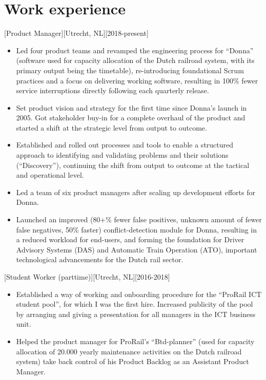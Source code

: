 \documentclass[10pt]{article}
\begin{document}
\makecvtitle

\section{Work experience}
\label{sec:work}

[Product Manager][Utrecht, NL][2018-present]
\begin{itemize}
      \item Led four product teams and revamped the engineering process for
            \enquote{Donna} (software used for capacity allocation of the Dutch railroad
            system, with its primary output being the timetable), re-introducing
            foundational Scrum practices and a focus on delivering working software,
            resulting in 100\% fewer service interruptions directly following each
            quarterly release.
      \item Set product vision and strategy for the first time since Donna's launch
            in 2005. Got stakeholder buy-in for a complete overhaul of the product and
            started a shift at the strategic level from output to outcome.
      \item Established and rolled out processes and tools to enable a structured
            approach to identifying and validating problems and their solutions
            (\enquote{Discovery}), continuing the shift from output to outcome at the
            tactical and operational level.
      \item Led a team of six product managers after scaling up development efforts
            for Donna.
      \item Launched an improved (80+\% fewer false positives, unknown amount of
            fewer false negatives, 50\% faster) conflict-detection module for Donna,
            resulting in a reduced workload for end-users, and forming the foundation for
            Driver Advisory Systems (DAS) and Automatic Train Operation (ATO), important
            technological advancements for the Dutch rail sector.
\end{itemize}

[Student Worker (parttime)][Utrecht, NL][2016-2018]
\begin{itemize}
      \item Established a way of working and onboarding procedure for the
            \enquote{ProRail ICT student pool}, for which I was the first hire. Increased
            publicity of the pool by arranging and giving a presentation for all managers
            in the ICT business unit.
      \item Helped the product manager for ProRail's \enquote{Btd-planner} (used for
            capacity allocation of 20.000 yearly maintenance activities on the Dutch
            railroad system) take back control of his Product Backlog as an Assistant
            Product Manager.
\end{itemize}
\end{document}
